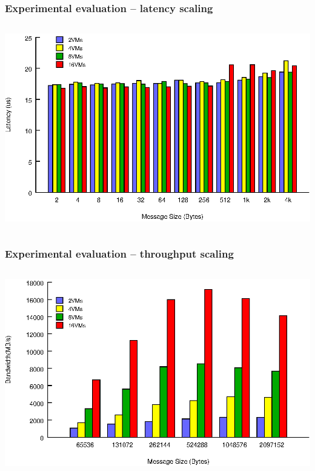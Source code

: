 \documentclass[red,slidestop,notes,compress,mathserif]{beamer}
\begin{document}
\begin{frame}
\frametitle{Experimental evaluation -- latency scaling}
\begin{columns}
\includegraphics[width=\textwidth]{figures/lat_stream_scale.eps}
\end{columns}

\end{frame}
\begin{frame}
\frametitle{Experimental evaluation -- throughput scaling}
\begin{columns}
\includegraphics[width=\textwidth]{figures/bw_stream_scale.eps}
\end{columns}
\end{frame}
\end{document}
